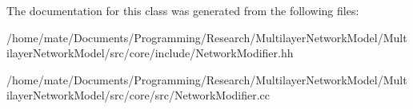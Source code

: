 The documentation for this class was generated from the following files\+:\begin{DoxyCompactItemize}
\item 
/home/mate/\+Documents/\+Programming/\+Research/\+Multilayer\+Network\+Model/\+Multilayer\+Network\+Model/src/core/include/Network\+Modifier.\+hh\item 
/home/mate/\+Documents/\+Programming/\+Research/\+Multilayer\+Network\+Model/\+Multilayer\+Network\+Model/src/core/src/Network\+Modifier.\+cc\end{DoxyCompactItemize}
